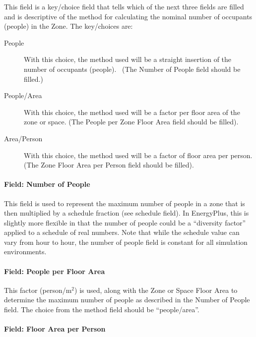This field is a key/choice field that tells which of the next three fields are filled and is descriptive of the method for calculating the nominal number of occupants (people) in the Zone. The key/choices are:

\begin{description}

\item[People] With this choice, the method used will be a straight insertion of the number of occupants (people).~ (The Number of People field should be filled.)

\item[People/Area] With this choice, the method used will be a factor per floor area of the zone or space. (The People per Zone Floor Area field should be filled).

\item[Area/Person] With this choice, the method used will be a factor of floor area per person. (The Zone Floor Area per Person field should be filled).

\end{description}

\paragraph{Field: Number of People}\label{field-number-of-people}

This field is used to represent the maximum number of people in a zone that is then multiplied by a schedule fraction (see schedule field). In EnergyPlus, this is slightly more flexible in that the number of people could be a ``diversity factor'' applied to a schedule of real numbers. Note that while the schedule value can vary from hour to hour, the number of people field is constant for all simulation environments.

\paragraph{Field: People per Floor Area}\label{field-people-per-zone-floor-area}

This factor (person/m\(^{2}\)) is used, along with the Zone or Space Floor Area to determine the maximum number of people as described in the Number of People field. The choice from the method field should be ``people/area''.

\paragraph{Field: Floor Area per Person}\label{field-zone-floor-area-per-person}

